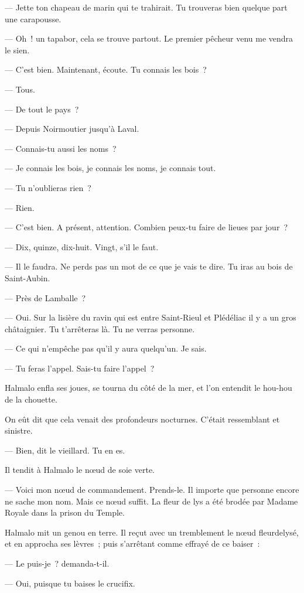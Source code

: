 \documentclass[french,twoside]{book} %
\begin{document}
— Jette ton chapeau de marin qui te trahirait. Tu trouveras bien quelque part une carapousse.\par
— Oh ! un tapabor, cela se trouve partout. Le premier pêcheur venu me vendra le sien.\par
— C’est bien. Maintenant, écoute. Tu connais les bois ?\par
— Tous.\par
— De tout le pays ?\par
— Depuis Noirmoutier jusqu’à Laval.\par
— Connais-tu aussi les noms ?\par
— Je connais les bois, je connais les noms, je connais tout.\par
— Tu n’oublieras rien ?\par
— Rien.\par
— C’est bien. A présent, attention. Combien peux-tu faire de lieues par jour ?\par
— Dix, quinze, dix-huit. Vingt, s’il le faut.\par
— Il le faudra. Ne perds pas un mot de ce que je vais te dire. Tu iras au bois de Saint-Aubin.\par
— Près de Lamballe ?\par
— Oui. Sur la lisière du ravin qui est entre Saint-Rieul et Plédéliac il y a un gros châtaignier. Tu t’arrêteras là. Tu ne verras personne.\par
— Ce qui n’empêche pas qu’il y aura quelqu’un. Je sais.\par
 — Tu feras l’appel. Sais-tu faire l’appel ?\par
Halmalo enfla ses joues, se tourna du côté de la mer, et l’on entendit le hou-hou de la chouette.\par
On eût dit que cela venait des profondeurs nocturnes. C’était ressemblant et sinistre.\par
— Bien, dit le vieillard. Tu en es.\par
Il tendit à Halmalo le nœud de soie verte.\par
— Voici mon nœud de commandement. Prends-le. Il importe que personne encore ne sache mon nom. Mais ce nœud suffit. La fleur de lys a été brodée par Madame Royale dans la prison du Temple.\par
Halmalo mit un genou en terre. Il reçut avec un tremblement le nœud fleurdelysé, et en approcha ses lèvres ; puis s’arrêtant comme effrayé de ce baiser :\par
— Le puis-je ? demanda-t-il.\par
— Oui, puisque tu baises le crucifix.\par
\end{document}

